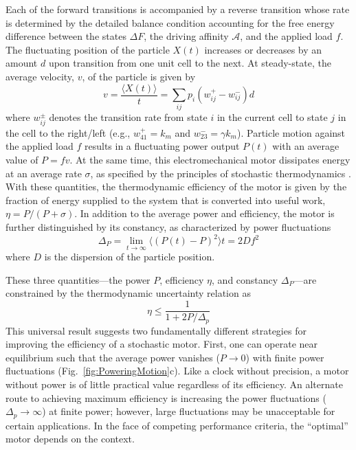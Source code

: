 \begin{appendices}
Each of the forward transitions is accompanied by a reverse transition whose rate is determined by the detailed balance condition accounting for the free energy difference between the states $\Delta F$, the driving affinity $\mathcal{A}$, and the applied load $f$.  The fluctuating position of the particle $X(t)$ increases or decreases by an amount $d$ upon transition from one unit cell to the next. At steady-state, the average velocity, $v$, of the particle is given by 
\begin{equation}
    v = \frac{\langle X(t)\rangle}{t}= \sum_{ij} p_i (w_{ij}^+ - w_{ij}^-)d
\end{equation}
where $w_{ij}^{\pm}$ denotes the transition rate from state $i$ in the current cell to state $j$ in the cell to the right/left (e.g., $w_{41}^+=k_m$ and $w_{23}^-=\gamma k_m$). Particle motion against the applied load $f$ results in a fluctuating power output $P(t)$ with an average value of $P=fv$. At the same time, this electromechanical motor dissipates energy at an average rate $\sigma$, as specified by the principles of stochastic thermodynamics \autocite{Pietzonka2016}.  With these quantities, the thermodynamic efficiency of the motor is given by the fraction of energy supplied to the system that is converted into useful work, $\eta = P / (P+\sigma)$. In addition to the average power and efficiency, the motor is further distinguished by its constancy, as characterized by power fluctuations
\begin{equation}
    \Delta_P = \lim_{t\rightarrow \infty}\langle (P(t)-P)^2 \rangle t = 2 D f^2
\end{equation}
where $D$ is the dispersion of the particle position.

These three quantities---the power $P$, efficiency $\eta$, and constancy $\Delta_P$---are constrained by the thermodynamic uncertainty relation \autocite{Pietzonka2016} as 
\begin{equation}
    \eta \leq \frac{1}{1+2P/\Delta_p} \label{eq:efficiency}
\end{equation}
This universal result suggests two fundamentally different strategies for improving the efficiency of a stochastic motor.  First, one can operate near equilibrium such that the average power vanishes ($P\rightarrow0$) with finite power fluctuations (Fig.~\ref{fig:PoweringMotion}c).  Like a clock without precision, a motor without power is of little practical value regardless of its efficiency.   An alternate route to achieving maximum efficiency is increasing the power fluctuations ($\Delta_p\rightarrow\infty$) at finite power; however, large fluctuations may be unacceptable for certain applications.  In the face of competing performance criteria, the ``optimal'' motor depends on the context.


\end{appendices}
